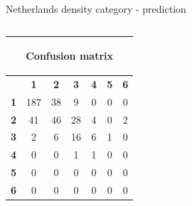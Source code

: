 \documentclass[c]{beamer}
\begin{document}
\begin{frame}
\begin{columns}
\begin{column}{0.5\textwidth}
\begin{overlayarea}{\linewidth}{4cm}
  \end{overlayarea}
  \begin{overlayarea}{\linewidth}{0.5cm}
    \centering
    \tiny Netherlands density category - prediction\par
  \end{overlayarea}
 \end{column}
\end{columns}
\begin{columns}
 \begin{column}{0.6\textwidth}
 \begin{overlayarea}{\linewidth}{2cm}
  \begin{table}
  \begin{center}
  \begin{adjustbox}{max width=0.6\textwidth}
  {\tiny
  \begin{tabular}{|c|c|c|c|c|c|c|}
    \hline
    \multicolumn{7}{|c|}{{\tiny \begin{bf}Confusion matrix\end{bf}}} \\
    \hline
     & \textbf{1} & \textbf{2} & \textbf{3} & \textbf{4} & \textbf{5} & \textbf{6}\\
    \hline
    \textbf{1} & 187 & 38 & 9 & 0 & 0 & 0\\
    \hline
    \textbf{2} & 41 & 46 & 28 & 4 & 0 & 2\\
    \hline
    \textbf{3} & 2 & 6 & 16 & 6 & 1 & 0\\
    \hline
    \textbf{4} & 0 & 0 & 1 & 1 & 0 & 0\\
    \hline
    \textbf{5} & 0 & 0 & 0 & 0 & 0 & 0\\
    \hline
    \textbf{6} & 0 & 0 & 0 & 0 & 0 & 0\\
    \hline
  \end{tabular}
  }
  \end{adjustbox}
  \end{center}
  \end{table}
 \end{overlayarea}
 \end{column}
 \begin{column}{0.6\textwidth}

\end{column}
\end{columns}
\end{frame}
\end{document}
